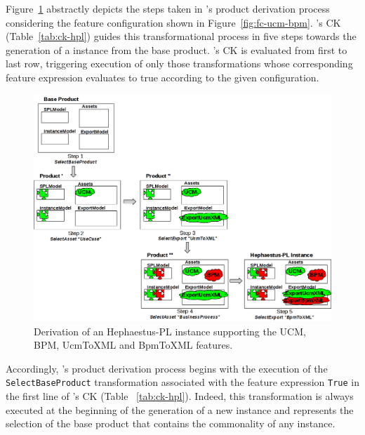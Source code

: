 Figure~\ref{fig:derivationHPL} abstractly depicts the steps taken in \hpl's product derivation process considering the feature configuration shown in  Figure~\ref{fig:fc-ucm-bpm}. \hpl{}'s CK (Table~\ref{tab:ck-hpl}) guides this transformational process in five steps towards the generation of a \hpl{} instance from the base product. \hpl{}'s CK is evaluated from first to last row, triggering execution of only those transformations whose corresponding feature expression evaluates to true according to the given configuration.

\begin{figure}[bth]
\begin{center}
\includegraphics[scale=0.4]{imagens/derivation.png}
\end{center}
\caption{Derivation of an Hephaestus-PL instance supporting the UCM, BPM, UcmToXML and BpmToXML features.}
\label{fig:derivationHPL}
\end{figure}

Accordingly, \hpl's product derivation process begins with the execution of the \texttt{SelectBaseProduct} transformation associated with
the feature expression \texttt{True} in the first line of \hpl's CK (Table ~\ref{tab:ck-hpl}). Indeed,
this transformation is always executed at the beginning of the generation of a new \hpl{} instance and represents the selection of the base product that contains the commonality of any \hpl{} instance.

%

